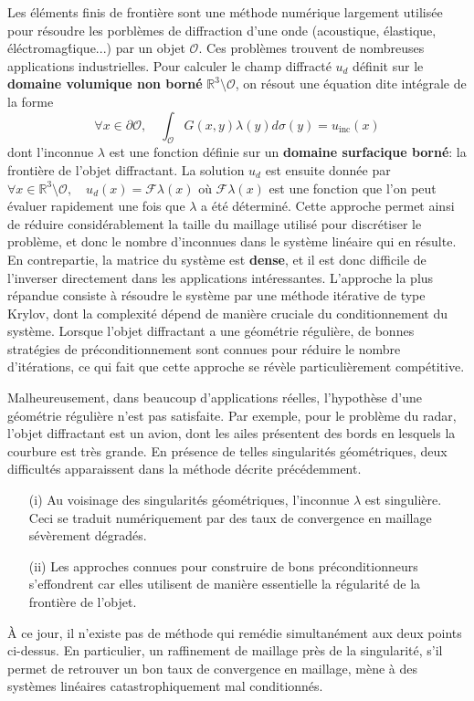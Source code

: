 \documentclass[10pt]{article}
\begin{document}
	Les \'el\'ements finis de fronti\`ere sont une m\'ethode num\'erique largement utilis\'ee pour r\'esoudre les porbl\`emes de diffraction d'une onde (acoustique, \'elastique, \'el\'ectromag\'tique...) par un objet $\mathcal{O}$. Ces probl\`emes trouvent de nombreuses applications industrielles. Pour calculer le champ diffract\'e $u_d$ d\'efinit sur le {\bf domaine volumique non born\'e} $\mathbb{R}^3\setminus \mathcal{O}$, on r\'esout une \'equation dite int\'egrale de la forme
	\[\forall x \in \partial \mathcal{O}, \quad \int_{\mathcal{O}} G(x,y) \lambda(y) d\sigma(y) = u_{\text{inc}}(x)\]
	dont l'inconnue $\lambda$ est une fonction d\'efinie sur un {\bf domaine surfacique born\'e}: la fronti\`ere de l'objet diffractant. La solution $u_d$ est ensuite donn\'ee par $\forall x \in \mathbb{R}^3\setminus \mathcal{O}, \quad u_d(x) = \mathcal{F} \lambda(x)$
	o\`u $\mathcal{F}\lambda(x)$  est une fonction que l'on peut \'evaluer rapidement une fois que $\lambda$ a \'et\'e d\'etermin\'e.
	Cette approche permet ainsi de r\'eduire consid\'erablement la taille du maillage utilis\'e pour discr\'etiser le probl\`eme, et donc le nombre d'inconnues dans le syst\`eme lin\'eaire qui en r\'esulte. En contrepartie, la matrice du syst\`eme est {\bf dense}, et il est donc difficile de  l'inverser directement dans les applications int\'eressantes. L'approche la plus r\'epandue consiste \`a r\'esoudre le syst\`eme par une m\'ethode it\'erative de type Krylov, dont la complexit\'e d\'epend de mani\`ere cruciale du conditionnement du syst\`eme. Lorsque l'objet diffractant a une g\'eom\'etrie r\'eguli\`ere, de bonnes strat\'egies de pr\'econditionnement sont connues pour r\'eduire le nombre d'it\'erations, ce qui fait que cette approche se r\'ev\`ele particuli\`erement comp\'etitive. 
	
	Malheureusement, dans beaucoup d'applications r\'eelles, l'hypoth\`ese d'une g\'eom\'etrie r\'eguli\`ere n'est pas satisfaite. Par exemple, pour le probl\`eme du radar, l'objet diffractant est un avion, dont les ailes pr\'esentent des bords en lesquels la courbure est tr\`es grande. En pr\'esence de telles singularit\'es g\'eom\'etriques, deux difficult\'es apparaissent dans la m\'ethode d\'ecrite pr\'ec\'edemment.
	\begin{itemize}
		\item[(i)] Au voisinage des singularit\'es g\'eom\'etriques, l'inconnue $\lambda$ est singuli\`ere. Ceci se traduit num\'eriquement par des taux de convergence en maillage s\'ev\`erement d\'egrad\'es. 
		\item[(ii)] Les approches connues pour construire de bons pr\'econditionneurs s'effondrent car elles utilisent de mani\`ere essentielle la r\'egularit\'e de la fronti\`ere de l'objet. 
	\end{itemize} 
	\`A ce jour, il n'existe pas de m\'ethode qui rem\'edie simultan\'ement aux deux points ci-dessus. En particulier, un raffinement de maillage pr\`es de la singularit\'e, s'il permet de retrouver un bon taux de convergence en maillage, m\`ene \`a des syst\`emes lin\'eaires catastrophiquement mal conditionn\'es. 
\end{document}
